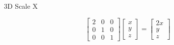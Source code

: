 \documentclass{beamer}
\begin{document}
\begin{frame}{3D Scale X}

\[ \left[ \begin{array}{ccc} 2 & 0 & 0\\ 0 & 1 & 0 \\ 0 & 0 & 1 \end{array} \right] \left[ \begin{array}{c} x \\ y \\ z \end{array} \right] =  \left[ \begin{array}{c} 2x \\ y \\ z \end{array} \right] \]

\begin{figure}[t]
    \captionsetup[subfloat]{labelformat=empty}
	\centering
\end{figure}

\end{frame}
\end{document}
